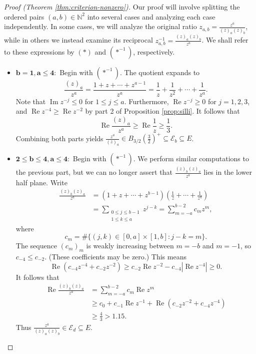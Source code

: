 \documentclass[11pt]{article}
\theoremstyle{definition}
\renewcommand{\Re}{\operatorname{Re}}
\renewcommand{\Im}{\operatorname{Im}}
\newcommand{\ball}[2]{B_{#2}(#1)}
\newcommand{\N}{\mathbb N}
\newcommand{\calE}{\mathcal E}
\begin{document}
\begin{proof}[Proof (Theorem \ref{thm:criterion-nonzero})]
	Our proof will involve splitting the ordered pairs $(a,b)\in\N^2$ into several cases and analyzing each case independently.  In some cases, we will analyze the original ratio $z_{a,b} = \tfrac{z^a}{(z)_a(z)_b}$, while in others we instead examine its reciprocal $z_{a,b}^{-1} = \tfrac{(z)_a(z)_b}{z^a}$.  We shall refer to these expressions by $(*)$ and $(*^{-1})$, respectively.
	
	\begin{itemize}
		\item $\boldsymbol{b=1,a\leq 4{:}}$ Begin with $(*^{-1})$.  The quotient expands to
		\[
		\frac{(z)_a}{z^a} = \frac{1+z+\cdots + z^{a-1}}{z^a} = \frac 1z + \frac1{z^2} + \cdots + \frac{1}{z^a}.
		\]
		Note that $\Im z^{-j} \leq 0$ for $1\leq j\leq a$.  Furthermore, $\Re z^{-j} \geq 0$ for $j=1,2,3$, and $\Re z^{-4} \geq \Re z^{-2}$ by
		part 2 of Proposition \ref{prop:silli}.  It  follows that
		\[
		\Re \frac{(z)_a}{z^a} \geq \Re \frac 1z \geq \frac 13.
		\]
		Combining both parts yields $\tfrac{z^a}{(z)_a}\in \ball{\tfrac 32}{3/2}^+\subseteq \calE_b\subseteq E$.
		
		\item $\boldsymbol{2 \leq b\leq 4, a \leq 4{:}}$ Begin with $(*^{-1})$.  We perform similar computations to the previous part, but we can no longer assert that $\tfrac{(z)_b(z)_a}{z^a}$ lies in the lower half plane.  Write
		\begin{align*}
			\frac{(z)_b(z)_a}{z^a} &= (1+z+\cdots+z^{b-1})\left(\frac 1z + \cdots + \frac{1}{z^a}\right)\\
			&=\sum_{\substack{0\leq j\leq b-1\\1\leq k\leq a}}z^{j-k} = \sum_{m = -a}^{b-2}c_m z^m,
		\end{align*}
		where
	\[
	c_m = \#\{(j,k)\in[0,a]\times[1,b]: j-k = m\}.
	\]
	The sequence $(c_m)_m$ is weakly increasing between $m = -b$ and $m= - 1$, so $c_{-4} \leq c_{-2}$.  (These coefficients may be zero.)  This means
	\[
	\Re (c_{-4} z^{-4} + c_{-2}z^{-2}) \geq c_{-2}\Re z^{-2} - c_{-4}|\Re z^{-4}| \geq 0.
	\]
	It follows that
	\begin{align*}
		\Re \frac{(z)_b(z)_a}{z^a} &= \sum_{m = -a}^{b-2} c_m \Re z^m \\
		& \geq c_0 + c_{-1}\Re z^{-1} + \Re(c_{-2}z^{-2} + c_{-4}z^{-4}) \\
		&\geq \frac 43 > 1.15.
	\end{align*}
	Thus $\tfrac{z^a}{(z)_a(z)_b}\in \calE_d\subseteq E$.
	

\end{itemize}
\end{proof}
\end{document}

